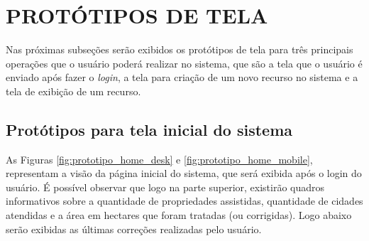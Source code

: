 \section{PROTÓTIPOS DE TELA}
\label{sec:titSecPrototipos}




Nas próximas subseções serão exibidos os protótipos de tela para três principais operações que o usuário poderá realizar no sistema, que são a tela que o usuário é enviado após fazer o \textit{login}, a tela para criação de um novo recurso no sistema e a tela de exibição de um recurso.

\subsection{Protótipos para tela inicial do sistema}
\label{sec:titSecPrototiposHome}

As Figuras \ref{fig:prototipo_home_desk} e \ref{fig:prototipo_home_mobile}, representam a visão da página inicial do sistema, que será exibida após o login do usuário. É possível observar que logo na parte superior, existirão quadros informativos sobre a quantidade de propriedades assistidas, quantidade de cidades atendidas e a área em hectares que foram tratadas (ou corrigidas). Logo abaixo serão exibidas as últimas correções realizadas pelo usuário.

